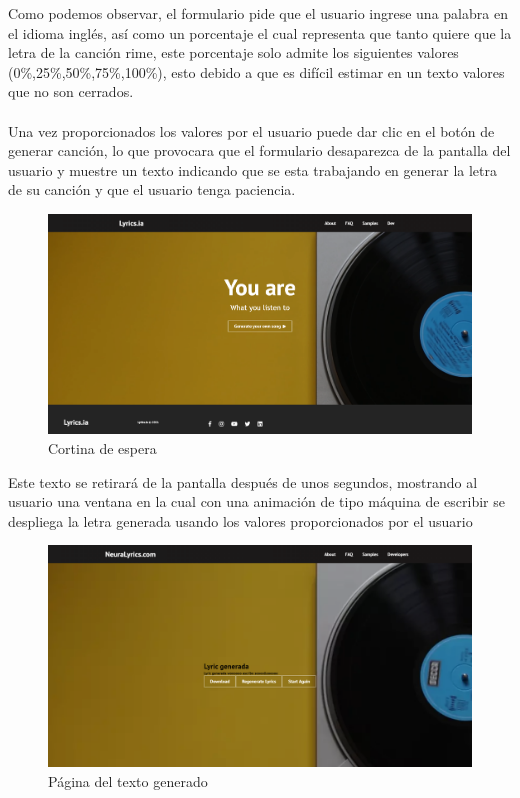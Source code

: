 \documentclass[12pt, a4paper, titlepage]{article}
\begin{document}
	Como podemos observar, el formulario pide que el usuario ingrese una palabra en el idioma inglés, así como un porcentaje el cual representa que tanto quiere que la letra de la canción rime, este porcentaje solo admite los siguientes valores (0\%,25\%,50\%,75\%,100\%), esto debido a que es difícil estimar en un texto valores que no son cerrados.\\\\
	Una vez proporcionados los valores por el usuario puede dar clic en el botón de generar canción, lo que provocara que el formulario desaparezca de la pantalla del usuario y muestre un texto indicando que se esta trabajando en generar la letra de su canción y que el usuario tenga paciencia.
	\begin{figure}[H] 
		\includegraphics[width=13.5cm]{./Imagenes/Capturas/x.png}
		\centering \caption{Cortina de espera}
	\end{figure}
	Este texto se retirará de la pantalla después de unos segundos, mostrando al usuario una ventana en la cual con una animación de tipo máquina de escribir se despliega la letra generada usando los valores proporcionados por el usuario
	\begin{figure}[H] 
		\includegraphics[width=13.5cm]{./Imagenes/Capturas/ptextogenerado.png}
		\centering \caption{Página del texto generado}
	\end{figure}
\end{document}
